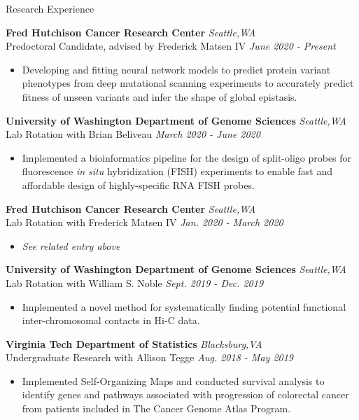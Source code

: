 \documentclass{resume} %
\begin{document}
\begin{rSection}{Research Experience}

{\bf Fred Hutchison Cancer Research Center} \hfill { \em Seattle,WA}\\
{Predoctoral Candidate, advised by Frederick Matsen IV} \hfill {\em June 2020 - Present}
\begin{itemize}
    \item Developing and fitting neural network models to predict protein variant phenotypes from deep mutational scanning experiments to accurately predict fitness of unseen variants and infer the shape of global epistasis.
\end{itemize}

{\bf University of Washington Department of Genome Sciences} \hfill { \em Seattle,WA}\\
{Lab Rotation with Brian Beliveau} \hfill {\em March 2020 - June 2020}
\begin{itemize}
    \item Implemented a bioinformatics pipeline for the design of split-oligo probes for fluorescence \emph{in situ} hybridization (FISH) experiments to enable fast and affordable design of highly-specific RNA FISH probes.
\end{itemize}

{\bf Fred Hutchison Cancer Research Center} \hfill { \em Seattle,WA}\\
{Lab Rotation with Frederick Matsen IV} \hfill {\em Jan. 2020 - March 2020}
\begin{itemize}
    \item \emph{See related entry above}
\end{itemize}

{\bf University of Washington Department of Genome Sciences} \hfill { \em Seattle,WA}\\
{Lab Rotation with William S. Noble} \hfill {\em Sept. 2019 - Dec. 2019}
\begin{itemize}
    \item Implemented a novel method for systematically finding potential functional inter-chromosomal contacts in Hi-C data.
\end{itemize}

{\bf Virginia Tech Department of Statistics} \hfill { \em Blacksburg,VA}\\
{Undergraduate Research with Allison Tegge} \hfill {\em Aug. 2018 - May 2019}
\begin{itemize}
    \item Implemented Self-Organizing Maps and conducted survival analysis to identify genes and pathways associated with progression of colorectal cancer from patients included in The Cancer Genome Atlas Program.
\end{itemize}


\end{rSection}
\end{document}
